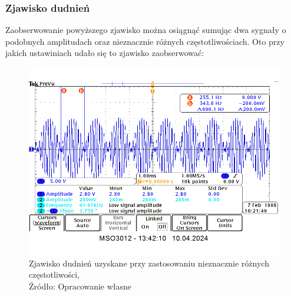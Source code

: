 \documentclass{article}
\begin{document}
      \subsubsection{Zjawisko dudnień}
        Zaobserwowanie powyższego zjawisko można osiągnąć sumując dwa sygnały o podobnych amplitudach oraz nieznacznie różnych częstotliwościach. Oto przy jakich ustawiniach udało się to zjawisko zaobserwować:

        \begin{table}[h]
          \centering
          \caption{Ustawienia dla których wystapiło zjawisko dudnień, \\Źródło: Opracowanie własne}
          \label{Tabela3}
      \end{table}

      \begin{figure}[!ht]
        \centering
        \includegraphics[scale=0.65]{grafiki/freq.png}
        \caption{Zjawisko dudnień uzyskane przy zastosowaniu nieznacznie różnych częstotliwości,
        \\Źródło: Opracowanie własne}
      \end{figure}
\end{document}
